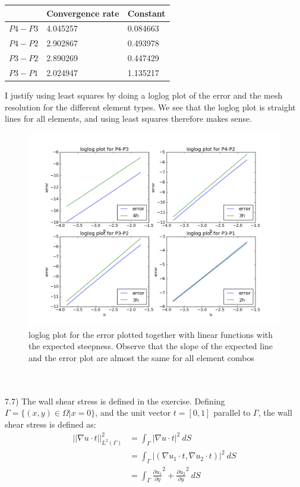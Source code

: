 \documentclass[11pt,a4paper]{report}
\begin{document}
\begin{center}
    \begin{tabular}{| l | l | l |}
    \hline
     & Convergence rate & Constant  \\ \hline
    $P4-P3$ & 4.045257 & 0.084663 \\ \hline
    $P4-P2$ & 2.902867 &  0.493978	\\ \hline
    $P3-P2$ & 2.890269 & 0.447429\\ \hline
    $P3-P1$ & 2.024947 &  1.135217	\\ \hline
    \end{tabular}
\end{center}
I justify using least squares by doing a loglog plot of the error and the mesh resolution for the different element types. We see that the loglog plot is straight lines for all elements, and using least squares therefore makes sense.
\begin{figure}
  \includegraphics[width=\linewidth]{element_con.png}
  \caption{loglog plot for the error plotted together with linear functions with the expected steepness. Observe that the slope of the expected line and the error plot are almost the same for all element combos}
  \label{Fig 1}
\end{figure}
\\
\\
7.7) The wall shear stress is defined in the exercise. Defining \\$\Gamma = \{(x,y) \in \Omega | x=0 \}$, and the unit vector $t=[0,1]$ parallel to $\Gamma$, the wall shear stress is defined as: 
\begin{align*}
||\nabla u\cdot t||_{L^2(\Gamma)}^2 &= \int_{\Gamma} |\nabla u \cdot t|^2  \ dS \\
&=  \int_{\Gamma} |(\nabla u_1 \cdot t,\nabla u_2 \cdot t)|^2  \ dS \\
&=\int_{\Gamma} \frac{\partial u_1}{\partial y}^2 + \frac{\partial u_2}{\partial y}^2 \ dS
\end{align*} 
\end{document}
